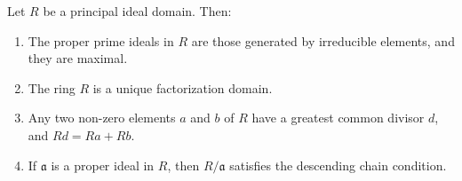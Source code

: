 Let $R$ be a principal ideal domain. Then:
\begin{enumerate}
\item The proper prime ideals in $R$ are those generated by irreducible elements, and they are maximal.
\item The ring $R$ is a unique factorization domain.
\item Any two non-zero elements $a$ and $b$ of $R$ have a greatest common divisor $d$, and $Rd = Ra + Rb$.
\item If $\mathfrak{a}$ is a proper ideal in $R$, then $R/\mathfrak{a}$ satisfies the descending chain condition.
\end{enumerate}
